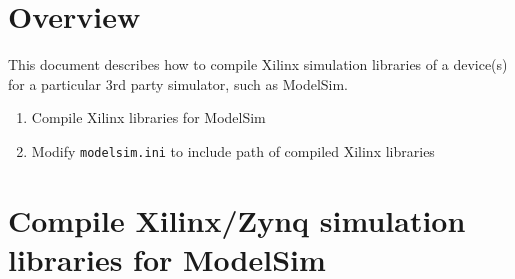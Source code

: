 \newpage

\tableofcontents

\newpage

\section{Overview}

	This document describes how to compile Xilinx simulation libraries of a device(s) for a particular 3rd party simulator, such as ModelSim.

	\begin{enumerate}
	 	\item Compile Xilinx libraries for ModelSim
		\item Modify \texttt{modelsim.ini} to include path of compiled Xilinx libraries
	\end{enumerate}

\section{Compile Xilinx/Zynq simulation libraries for ModelSim}
